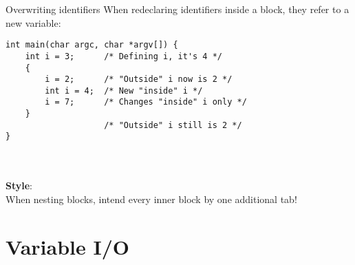 \begin{frame}[fragile]{Overwriting identifiers}
	When redeclaring identifiers inside a block, they refer to a new variable:
	\begin{lstlisting}
int main(char argc, char *argv[]) {
	int i = 3;		/* Defining i, it's 4 */
	{
		i = 2;		/* "Outside" i now is 2 */
		int i = 4;	/* New "inside" i */
		i = 7;		/* Changes "inside" i only */
	}
					/* "Outside" i still is 2 */
}
\end{lstlisting}\ \\
	\ \\
	\textbf{Style}:\\
	When nesting blocks, intend every inner block by one additional tab!
\end{frame}
\section{Variable I/O}
